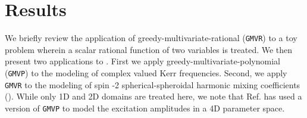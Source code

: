 \documentclass[twocolumn,aps,prd,floatfix,preprintnumbers,a4paper,nofootinbib,
superscriptaddress,10pt]{revtex4-1}
\def\gmvp#1{greedy-multivariate-polynomial#1
  (\texttt{GMVP}#1)\gdef\gmvp{\texttt{GMVP}}}
\def\gmvr#1{greedy-multivariate-rational#1
  (\texttt{GMVR}#1)\gdef\gmvr{\texttt{GMVR}}}
\begin{document}
\section{Results}
\label{results}
%
\par We briefly review the application of \gmvr{} to a toy problem wherein a scalar rational function of two variables is treated.
%
%
%
We then present two applications to .
%
First we apply \gmvp{} to the modeling of complex valued Kerr \qnm{} frequencies.
%
Second, we apply \gmvr{} to the modeling of spin -2 spherical-spheroidal harmonic mixing coefficients ().
%
While only 1D and 2D domains are treated here, we note that Ref. \cite{London:2018gaq} has used a version of \gmvp{} to model the \qnm{} excitation amplitudes in a 4D parameter space.
%
\end{document}
